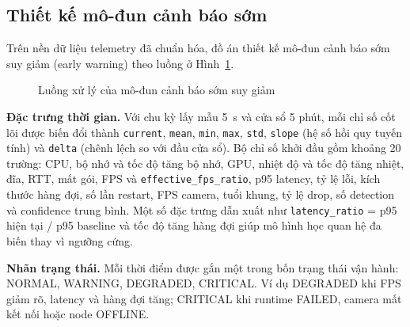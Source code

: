 \subsection{Thiết kế mô-đun cảnh báo sớm}

Trên nền dữ liệu telemetry đã chuẩn hóa, đồ án thiết kế mô-đun cảnh báo sớm
suy giảm (early warning) theo luồng ở Hình~\ref{fig:monitoring-incident-flow}.

\begin{figure}[H]
\centering
{}
\caption{Luồng xử lý của mô-đun cảnh báo sớm suy giảm}
\label{fig:monitoring-incident-flow}
\end{figure}

\textbf{Đặc trưng thời gian.} Với chu kỳ lấy mẫu 5~s và cửa sổ 5 phút, mỗi chỉ
số cốt lõi được biến đổi thành \texttt{current}, \texttt{mean}, \texttt{min},
\texttt{max}, \texttt{std}, \texttt{slope} (hệ số hồi quy tuyến tính) và
\texttt{delta} (chênh lệch so với đầu cửa sổ). Bộ chỉ số khởi đầu gồm khoảng 20
trường: CPU, bộ nhớ và tốc độ tăng bộ nhớ, GPU, nhiệt độ và tốc độ tăng nhiệt, đĩa,
RTT, mất gói, FPS và \texttt{effective\_fps\_ratio}, p95 latency, tỷ lệ lỗi, kích
thước hàng đợi, số lần restart, FPS camera, tuổi khung, tỷ lệ drop, số detection và
confidence trung bình. Một số đặc trưng dẫn xuất như
\texttt{latency\_ratio} = p95 hiện tại / p95 baseline và tốc độ tăng hàng đợi giúp
mô hình học quan hệ đa biến thay vì ngưỡng cứng.

\textbf{Nhãn trạng thái.} Mỗi thời điểm được gắn một trong bốn trạng thái vận
hành: NORMAL, WARNING, DEGRADED, CRITICAL. Ví dụ DEGRADED khi FPS giảm rõ, latency
và hàng đợi tăng; CRITICAL khi runtime FAILED, camera mất kết nối hoặc node OFFLINE.

